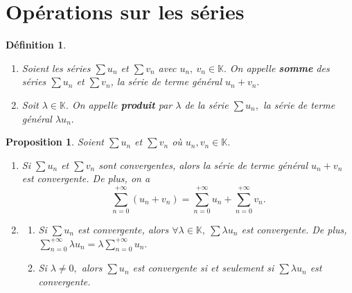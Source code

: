 \documentclass[11pt, a4paper]{book}
\newtheorem{defi}{D\'efinition}[section]
\newtheorem{pro}{Proposition}[section]
\begin{document}
\section{Op\'erations sur les s\'eries}
\begin{defi} \begin{enumerate}
\item Soient les s\'eries $\sum u_{n}$ et $\sum v_{n}$ avec $u_{n},~ v_{n} \in \mathbb{K}.$ On appelle \textbf{somme} des s\'eries $\sum u_{n}$ et $\sum v_{n}$, la s\'erie de terme g\'en\'eral $u_{n}+v_{n}.$
\item Soit $ \lambda \in \mathbb{K}.$ On appelle \textbf{produit} par $ \lambda$ de la s\'erie $\sum u_{n},$ la s\'erie de terme g\'en\'eral $ \lambda u_{n}.$ \end{enumerate} \end{defi}
\begin{pro} \label{pro0i} Soient $\sum u_{n}$ et $\sum v_{n}$ o\`u $u_{n}, v_{n} \in \mathbb{K}.$ \begin{enumerate}
\item[i-]  Si $\sum u_{n}$ et $\sum v_{n}$ sont convergentes, alors la s\'erie de terme g\'en\'eral $u_{n}+v_{n}$ est convergente. De plus, on a $$\sum_{n=0}^{+\infty} (u_{n}+v_{n})= \sum_{n=0}^{+\infty}u_{n}+\sum_{n=0}^{+\infty}v_{n}.$$
\item[ii-] \begin{enumerate}
\item[a-]  Si $\sum u_{n}$ est convergente, alors $\forall \lambda \in \mathbb{K}, ~\sum \lambda u_{n}$ est convergente. De plus, ${\displaystyle \sum_{n=0}^{+\infty} \lambda u_{n}=\lambda \sum_{n=0}^{+\infty}u_{n}}.$
\item[b-]  Si $\lambda\neq 0,$ alors $\sum u_{n}$ est convergente si et seulement si $\sum \lambda u_{n}$ est convergente.
\end{enumerate}
\end{enumerate} \end{pro}
\end{document}
